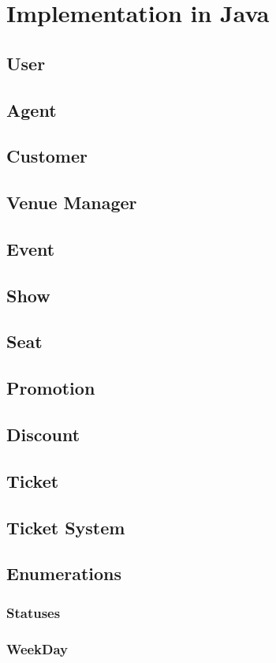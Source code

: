 \chapter{Implementation in Java}


\section{User}
\section{Agent}
\section{Customer}
\section{Venue Manager}

\section{Event}
\section{Show}
\section{Seat}

\section{Promotion}
\section{Discount}

\section{Ticket}
\section{Ticket System}

\section{Enumerations}
\subsection{Statuses}
\subsection{WeekDay}

